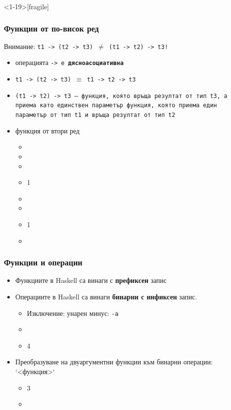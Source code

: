 \documentclass[alsotrans,beameroptions={aspectratio=169}]{beamerswitch}
\begin{document}
\begin{frame}<1-19>[fragile]
  \frametitle{Функции от по-висок ред}

  \alert{Внимание:} \tt{t1 -> (t2 -> t3)} $\neq$ \tt{(t1 -> t2) -> t3}!\pause
  \begin{itemize}[<+->]
  \item операцията \tt{->} е \textbf{дясноасоциативна}
  \item \tt{t1 -> (t2 -> t3)} $\equiv$ \tt{t1 -> t2 -> t3}
  \item \tt{(t1 -> t2) -> t3} --- функция, която връща резултат от тип \tt{t3}, а приема като единствен параметър функция, която приема един параметър от тип \tt{t1} и връща резултат от тип \tt{t2}
  \item \alert{функция от втори ред}
    \begin{itemize}
    \item {}
    \item {}
    \item {}
    \item {}1\pause
    \item {}
    \item {}
    \item {}1
    \item {}
    \end{itemize}
  \end{itemize}
\end{frame}

\begin{frame}
  \frametitle{Функции и операции}
  \begin{itemize}[<+->]
  \item Функциите в Haskell са винаги с \textbf{префиксен} запис
  \item Операциите в Haskell са винаги \textbf{бинарни с инфиксен}
    запис.
    \begin{itemize}
    \item \alert{Изключение:} унарен минус: \tt{-a}
    \item {}
    \item {}4
    \end{itemize}
  \item Преобразуване на двуаргументни функции към бинарни операции: \tta`<функция>\tta`
    \begin{itemize}
    \item {}3
    \item {}
    \end{itemize}
  \end{itemize}
\end{frame}
\end{document}
